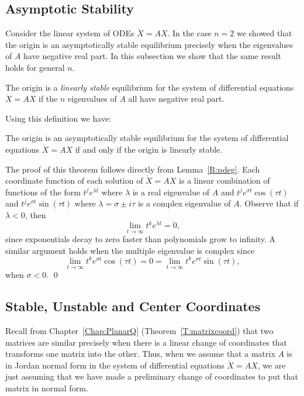 \subsection*{Asymptotic Stability}


Consider the linear system of ODEs $\dot{X}=AX$.  In the case $n=2$ we showed 
that the origin is an asymptotically stable equilibrium precisely when the 
eigenvalues of $A$ have negative real part.  In this subsection we show that the 
same result holds for general $n$. 
\begin{Def}  \label{D:linstab}
The origin is a {\em linearly stable\/} equilibrium for the system 
of differential equations $\dot{X}=AX$ if the $n$ eigenvalues of $A$ 
all have negative real part.  
\end{Def}
Using this definition we have:
\begin{thm}  \label{T:linstab}
The origin is an asymptotically stable equilibrium for the system of 
differential equations $\dot{X}=AX$ if and only if the origin is linearly stable.
\end{thm}

\proof The proof of this theorem follows directly from Lemma~\ref{R:pdeg}.
Each coordinate function of each solution of $\dot{X}=AX$ is a linear 
combination of functions of the form $t^je^{\lambda t}$ where $\lambda$ is 
a real eigenvalue of $A$ and $t^je^{\sigma t}\cos(\tau t)$ and 
$t^je^{\sigma t}\sin(\tau t)$ where $\lambda=\sigma\pm i\tau$ is a complex
eigenvalue of $A$.  Observe that if $\lambda < 0$, then
\[
\lim_{t\to\infty}t^ke^{\lambda t} = 0,
\]
since exponentials decay to zero faster than 
polynomials grow to infinity.  A similar argument holds when the multiple 
eigenvalue is complex since 
\[
\lim_{t\to\infty}t^ke^{\sigma t}\cos(\tau t) = 0 = 
\lim_{t\to\infty}t^ke^{\sigma t}\sin(\tau t),
\]
when $\sigma < 0$.  \qed

\subsection*{Stable, Unstable and Center Coordinates}

Recall from Chapter~\ref{Chap:PlanarQ} (Theorem~\ref{T:matrixcoord}) that 
two matrices are similar 
precisely when there is a linear change of 
coordinates that transforms
one matrix into the other.  Thus, when we assume that a matrix $A$ is in 
Jordan normal form in the system of differential 
equations $\dot{X}=AX$, 
we are just assuming that we have made a preliminary change of coordinates
to put that matrix in normal form. 

